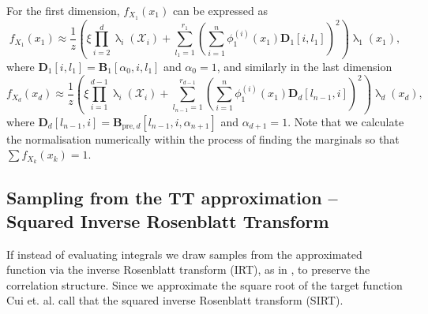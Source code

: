 For the first dimension, $f_{X_1}(x_1)$ can be expressed as
\begin{equation}
	f_{X_1}(x_1)  \approx \frac{1}{z} \left(\xi \prod_{i=2}^{d} \uplambda_i(\mathcal{X}_i) + \sum_{l_1=1}^{r_1} \left(\sum_{i=1}^{n} \phi^{(i)}_1(x_1) \bm{D}_1[i, l_1] \right)^2 \right) \uplambda_1(x_1),
	\label{eq:firstMarg}
\end{equation}
where $\bm{D}_1[i, l_1] = \bm{B}_1[\alpha_0, i, l_1]$ and $\alpha_0 = 1$,
and similarly in the last dimension
\begin{equation}
	f_{X_d}(x_d)  \approx \frac{1}{z} \left(\xi \prod_{i=1}^{d-1} \uplambda_i(\mathcal{X}_i) + \sum_{l_{n-1}=1}^{r_{d-1}} \left(\sum_{i=1}^{n} \phi^{(i)}_1(x_1) \bm{D}_d[l_{n-1},i] \right)^2 \right) \uplambda_d(x_d),
\end{equation}
where $\bm{D}_d[l_{n-1},i] = \bm{B}_{\text{pre},d}[l_{n-1}, i, \alpha_{n+1}]$ and $\alpha_{d+1} = 1$.
Note that we calculate the normalisation numerically within the process of finding the marginals so that $\sum f_{X_k}(x_k) = 1$.

\subsection{Sampling from the TT approximation -- Squared Inverse Rosenblatt Transform}
If instead of evaluating integrals we draw samples from the approximated function via the inverse Rosenblatt transform (IRT), as in \cite{dolgov2020approximation}, to preserve the correlation structure.
Since we approximate the square root of the target function Cui et. al. \cite{cui2022deep} call that the squared inverse Rosenblatt transform (SIRT).


